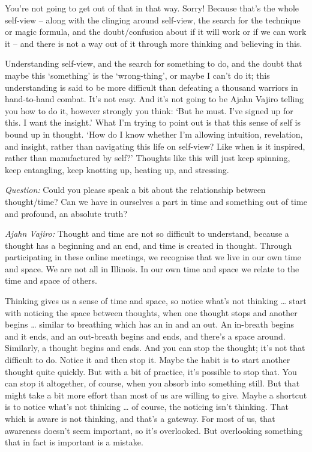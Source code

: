 You're not going to get out of that in that way. Sorry! Because that's the whole
self-view -- along with the clinging around self-view, the search for the
technique or magic formula, and the doubt/confusion about if it will work or if
we can work it -- and there is not a way out of it through more thinking and believing in this.

\enlargethispage{2\baselineskip}

Understanding self-view, and the search for something to do, and the doubt that
maybe this `something' is the `wrong-thing', or maybe I can't do it; this understanding is
said to be more difficult than defeating a thousand warriors in hand-to-hand
combat. It's not easy. And it's not going to be Ajahn Vajiro telling you how to
do it, however strongly you think: `But he must. I've signed up for this. I want
the insight.' What I'm trying to point out is that this sense of self is
bound up in thought. `How do I know whether I'm allowing intuition, revelation,
and insight, rather than navigating this life on self-view? Like when is it inspired,
rather than manufactured by self?' Thoughts like this will just keep spinning, keep
entangling, keep knotting up, heating up, and stressing.

\clearpage

\emph{Question:} Could you please speak a bit about the relationship between
thought/time? Can we have in ourselves a part in time and something out of time
and profound, an absolute truth?

\emph{Ajahn Vajiro:} Thought and time are not so difficult to understand, because a
thought has a beginning and an end, and time is created in thought. Through
participating in these online meetings, we recognise that we live in our own
time and space. We are not all in Illinois. In our own time and space we relate to the time and space of others.

Thinking gives us a sense of time and space, so notice what's not thinking \ldots{} 
start with noticing the space between thoughts, when one thought stops
and another begins \ldots{} similar to breathing which has an in and an out.
An in-breath begins and it ends, and an out-breath begins and ends, and there's
a space around. Similarly, a thought begins and ends. And you can stop the
thought; it's not that difficult to do. Notice it and then stop it. Maybe the
habit is to start another thought quite quickly. But with a bit of practice,
it's possible to stop that. You can stop it altogether, of course, when you
absorb into something still. But that might take a bit more effort than most of us are
willing to give. Maybe a shortcut is to notice what's not thinking \ldots{} of
course, the noticing isn't thinking. That which is aware is not thinking, and
that's a gateway. For most of us, that awareness doesn't seem important, so it's
overlooked. But overlooking something that in fact is important is a mistake.

